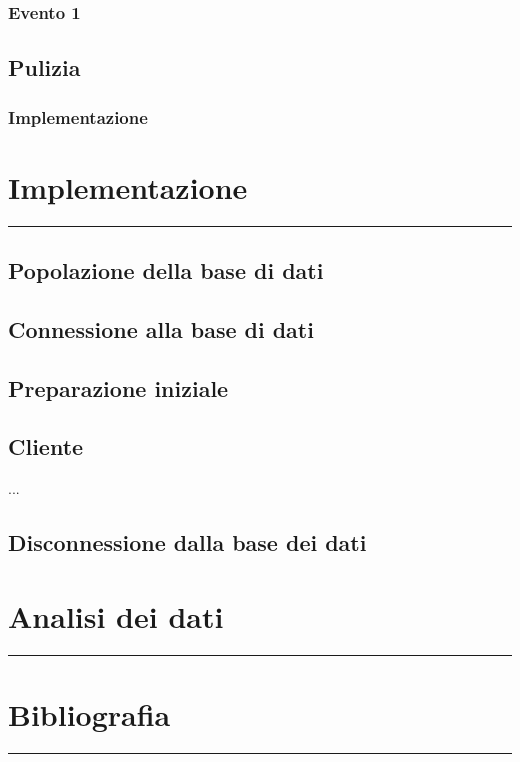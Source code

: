 \documentclass[legalpaper]{article}
\begin{document}
\subsubsection{Evento 1}
\subsection{Pulizia}
\subsubsection{Implementazione}
\newpage

\section{Implementazione}
\rule{\linewidth}{1.5pt}
\subsection{Popolazione della base di dati}
\subsection{Connessione alla base di dati}
\subsection{Preparazione iniziale}
\subsection{Cliente}

...

\subsection{Disconnessione dalla base dei dati}
\newpage
\section{Analisi dei dati}
\rule{\linewidth}{1.5pt}

\newpage

\section{Bibliografia}
\rule{\linewidth}{1.5pt}
\end{document}
